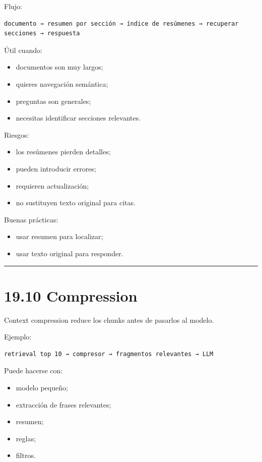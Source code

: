 Flujo:

\begin{lstlisting}
documento → resumen por sección → índice de resúmenes → recuperar secciones → respuesta
\end{lstlisting}

Útil cuando:

\begin{itemize}
\tightlist
\item
  documentos son muy largos;
\item
  quieres navegación semántica;
\item
  preguntas son generales;
\item
  necesitas identificar secciones relevantes.
\end{itemize}

Riesgos:

\begin{itemize}
\tightlist
\item
  los resúmenes pierden detalles;
\item
  pueden introducir errores;
\item
  requieren actualización;
\item
  no sustituyen texto original para citas.
\end{itemize}

Buenas prácticas:

\begin{itemize}
\tightlist
\item
  usar resumen para localizar;
\item
  usar texto original para responder.
\end{itemize}

\begin{center}\rule{0.5\linewidth}{0.5pt}\end{center}

\section{19.10 Compression}\label{compression}

Context compression reduce los chunks antes de pasarlos al modelo.

Ejemplo:

\begin{lstlisting}
retrieval top 10 → compresor → fragmentos relevantes → LLM
\end{lstlisting}

Puede hacerse con:

\begin{itemize}
\tightlist
\item
  modelo pequeño;
\item
  extracción de frases relevantes;
\item
  resumen;
\item
  reglas;
\item
  filtros.
\end{itemize}

